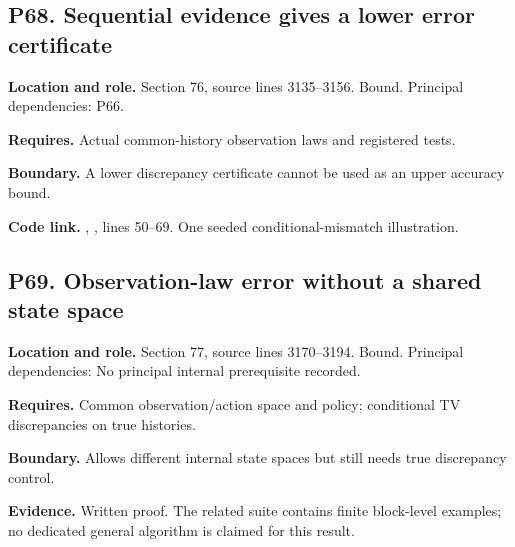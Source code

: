 \documentclass[11pt,oneside,openany]{book}
\numberwithin{equation}{section}
\begin{document}
\par\noindent\begin{minipage}{\textwidth}
\subsection{P68. Sequential evidence gives a lower error
certificate}\label{LSMRegister:p68.-sequential-evidence-gives-a-lower-error-certificate}

\textbf{Location and role.} Section 76, source lines 3135--3156. Bound.
Principal dependencies: P66.

\textbf{Requires.} Actual common-history observation laws and registered
tests.

\textbf{Boundary.} A lower discrepancy certificate cannot be used as an
upper accuracy bound.

\textbf{Code link.} ,
, lines 50--69. One seeded
conditional-mismatch illustration.
\end{minipage}\par\medskip

\par\noindent\begin{minipage}{\textwidth}
\subsection{P69. Observation-law error without a shared state
space}\label{LSMRegister:p69.-observation-law-error-without-a-shared-state-space}

\textbf{Location and role.} Section 77, source lines 3170--3194. Bound.
Principal dependencies: No principal internal prerequisite recorded.

\textbf{Requires.} Common observation/action space and policy;
conditional TV discrepancies on true histories.

\textbf{Boundary.} Allows different internal state spaces but still
needs true discrepancy control.

\textbf{Evidence.} Written proof. The related suite contains finite
block-level examples; no dedicated general algorithm is claimed for this
result.
\end{minipage}\par\medskip
\end{document}
